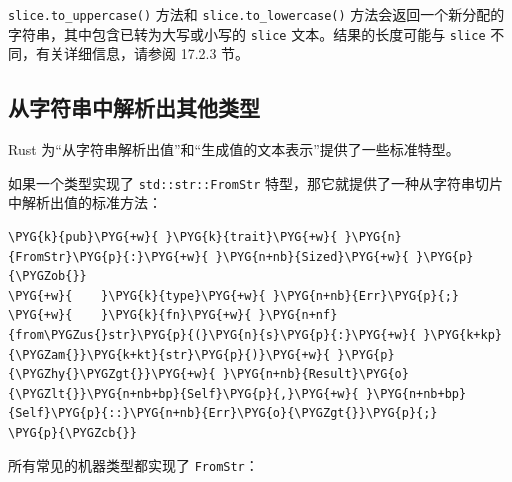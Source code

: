 \texttt{slice.to\_uppercase()} 方法和 \texttt{slice.to\_lowercase()} 方法会返回一个新分配的字符串，其中包含已转为大写或小写的 \texttt{slice} 文本。结果的长度可能与 \texttt{slice} 不同，有关详细信息，请参阅 17.2.3 节。

\subsection{从字符串中解析出其他类型}

Rust 为“从字符串解析出值”和“生成值的文本表示”提供了一些标准特型。

如果一个类型实现了 \texttt{std::str::FromStr} 特型，那它就提供了一种从字符串切片中解析出值的标准方法：

\begin{Verbatim}[commandchars=\\\{\},breaklines=true,breakanywhere=true,fontsize=\codefont,xleftmargin=17bp]
\PYG{k}{pub}\PYG{+w}{ }\PYG{k}{trait}\PYG{+w}{ }\PYG{n}{FromStr}\PYG{p}{:}\PYG{+w}{ }\PYG{n+nb}{Sized}\PYG{+w}{ }\PYG{p}{\PYGZob{}}
\PYG{+w}{    }\PYG{k}{type}\PYG{+w}{ }\PYG{n+nb}{Err}\PYG{p}{;}
\PYG{+w}{    }\PYG{k}{fn}\PYG{+w}{ }\PYG{n+nf}{from\PYGZus{}str}\PYG{p}{(}\PYG{n}{s}\PYG{p}{:}\PYG{+w}{ }\PYG{k+kp}{\PYGZam{}}\PYG{k+kt}{str}\PYG{p}{)}\PYG{+w}{ }\PYG{p}{\PYGZhy{}\PYGZgt{}}\PYG{+w}{ }\PYG{n+nb}{Result}\PYG{o}{\PYGZlt{}}\PYG{n+nb+bp}{Self}\PYG{p}{,}\PYG{+w}{ }\PYG{n+nb+bp}{Self}\PYG{p}{::}\PYG{n+nb}{Err}\PYG{o}{\PYGZgt{}}\PYG{p}{;}
\PYG{p}{\PYGZcb{}}
\end{Verbatim}

所有常见的机器类型都实现了 \texttt{FromStr}：

